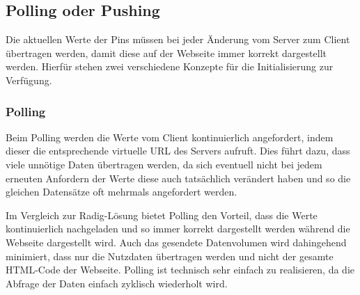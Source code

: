 
\subsection{Polling oder Pushing}
Die aktuellen Werte der Pins müssen bei jeder Änderung vom Server zum Client übertragen
werden, damit diese auf der Webseite immer korrekt dargestellt werden. Hierfür stehen zwei
verschiedene Konzepte für die Initialisierung zur Verfügung.

\subsubsection{Polling}
Beim Polling werden die Werte vom Client kontinuierlich angefordert, indem
dieser die entsprechende virtuelle \ac{URL} des Servers aufruft. Dies führt
dazu, dass viele unnötige Daten übertragen werden, da sich eventuell nicht bei
jedem erneuten Anfordern der Werte diese auch tatsächlich verändert haben und
so die gleichen Datensätze oft mehrmals angefordert werden.

Im Vergleich zur Radig-Lösung bietet Polling den Vorteil, dass die Werte
kontinuierlich nachgeladen und so immer korrekt dargestellt werden während die Webseite dargestellt
wird. Auch das gesendete Datenvolumen wird dahingehend minimiert, dass nur die
Nutzdaten übertragen werden und nicht der gesamte HTML-Code der Webseite. Polling ist technisch sehr
einfach zu realisieren, da die Abfrage der Daten einfach zyklisch wiederholt
wird.

